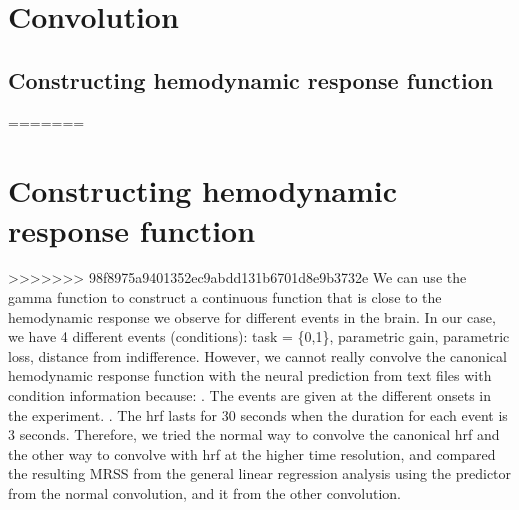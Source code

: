 \section {Convolution}

\subsection{Constructing hemodynamic response function}
=======

\section{Constructing hemodynamic response function}
>>>>>>> 98f8975a9401352ec9abdd131b6701d8e9b3732e
We can use the gamma function to construct a continuous function that is close to 
the hemodynamic response we observe for different events in the brain. In our case,
we have 4 different events (conditions): task = \{0,1\}, parametric gain, parametric loss, distance 
from indifference. However, we cannot really convolve the canonical hemodynamic response function with the neural prediction from text files with condition information because:\newline
\newline
{}. The events are given at the different onsets in the experiment.\newline
{}. The hrf lasts for 30 seconds when the duration for each event is 3 seconds.\newline
\newline
Therefore, we tried the normal way to convolve the canonical hrf and the other way to convolve with hrf at the higher time resolution, and compared the resulting MRSS from the general linear regression analysis using the predictor from the normal convolution, and it from the other convolution.\newline


